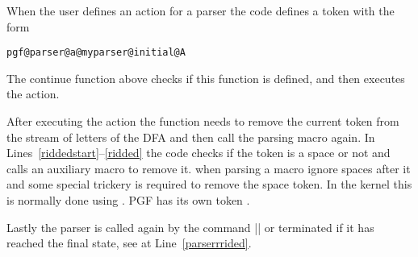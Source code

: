 \begin{teXXX}
\def\pgf@parser@cont{%
  \expandafter\let\expandafter\pgf@parser@action%
  \csname pgf@parser@a@\pgf@parser @\pgf@parser@state @\meaning\pgf@parser@symbol\endcsname%
  \ifx\pgf@parser@action\relax%
    \expandafter\let\expandafter\pgf@parser@action%
    \csname pgf@parser@a@\pgf@parser @all@\meaning\pgf@parser@symbol\endcsname%
    \ifx\pgf@parser@action\relax%
      \pgferror{Unexpected character
        '\meaning\pgf@parser@symbol' in parser '\pgf@parser' in state
        '\pgf@parser@state'}%
    \fi%
  \fi%
  \pgf@parser@action%
  \ifx\pgf@parser@symbol\pgfutil@sptoken(*@\label{riddedstart}@*)%
    \expandafter\pgf@parser@rid@space%
  \else%
    \expandafter\pgf@parser@rid@other%
  \fi(*@\label{ridded}@*)%
}
\end{teXXX}


When the user defines an action for a parser the code defines a token with the form

\texttt{pgf@parser@a@myparser@initial@\meaning A}

The continue function above checks if this function is defined, and then executes the action. 

After executing the action the function needs to remove the current token from the stream of letters of the DFA and then call the parsing macro again. In Lines~\ref{riddedstart}--\ref{ridded} the code checks if the token is a space or not and calls an auxiliary macro to remove it. \tex when parsing a macro ignore spaces after it and some special trickery is required to remove the space token. In the \latexe kernel this is normally done using \cmd{\sp@token}. PGF has its own token \cmd{\pgfutil@sptoken}.

\begin{teXXX}
{%
  \def\:{\pgf@parser@rid@space} \expandafter\gdef\: {\futurelet\pgf@parser@ignore\pgf@parser@ridded}
  \gdef\pgf@parser@rid@other{\afterassignment\pgf@parser@ridded\let\pgf@parser@ignore=}  
}
\end{teXXX}

Lastly the parser is called again by the command |\pgf@parser@ridded| or terminated if it has reached the final state, see \cmd{\pgf@parser@ridded} at Line~\ref{parserrrided}.

\begin{teXXX}
\def\pgf@parser@ridded{(*@\label{parserrrided}@*)%
  \ifx\pgf@parser@state\pgf@parser@final@text%
  \else%
    \expandafter\pgf@parser@parse%
  \fi%
}
\end{teXXX}















